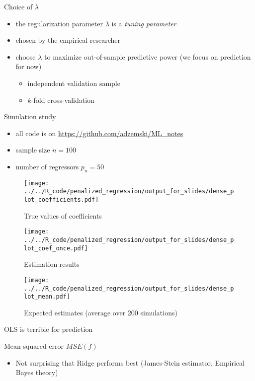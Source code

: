 \documentclass[xcolor=dvipsnames, handout]{beamer}
\begin{document}
\begin{frame}{Choice of $\lambda$}
\begin{itemize}
\item the regularization parameter $\lambda$ is a \emph{tuning parameter}
\item chosen by the empirical researcher
\item choose $\lambda$ to maximize out-of-sample predictive power (we focus on prediction for now) 
\begin{itemize}
  \item independent validation sample 
  \item $k$-fold cross-validation
\end{itemize}
\end{itemize}
\end{frame}


\begin{frame}{Simulation study}
\begin{itemize}
  \item all code is on \url{https://github.com/adzemski/ML_notes}
  \item sample size $n = 100$
  \item number of regressors $p_n = 50$
\end{itemize}
\end{frame}


\begin{frame}
\begin{figure}
  \texttt{[image: ../../R\_code/penalized\_regression/output\_for\_slides/dense\_plot\_coefficients.pdf]}
   \caption{True values of coefficients}
\end{figure}
\end{frame}

\begin{frame}
\begin{figure}
  \texttt{[image: ../../R\_code/penalized\_regression/output\_for\_slides/dense\_plot\_coef\_once.pdf]}
   \caption{Estimation results}
\end{figure}
\end{frame}

\begin{frame}
\begin{figure}
  \texttt{[image: ../../R\_code/penalized\_regression/output\_for\_slides/dense\_plot\_mean.pdf]}
   \caption{Expected estimates (average over 200 simulations)}
\end{figure}
\end{frame}

\begin{frame}{OLS is terrible for prediction}
\begin{table}
  
  \caption{Mean-squared-error $MSE(f)$}
\end{table}
\begin{itemize}
  \item Not surprising that Ridge performs best (James-Stein estimator, Empirical Bayes theory)
\end{itemize}
\end{frame}
\end{document}
